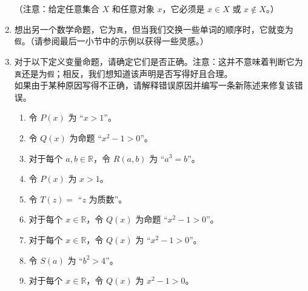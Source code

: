 \begin{enumerate}[label=(\arabic*)]
\begin{enumerate}[label=(\alph*)]
        \end{enumerate}
        （注意：给定任意集合 $X$ 和任意对象 $x$，它必须是 $x \in X$ 或 $x \notin X$。）
    \item 想出另一个数学命题，它为\verb|真|，但当我们交换一些单词的顺序时，它就变为\verb|假|。（请参阅最后一小节中的示例以获得一些灵感。）
    \item 对于以下定义变量命题，请确定它们是否正确。注意：这并不意味着判断它为\verb|真|还是为\verb|假|；相反，我们想知道该声明是否写得好且合理。\\
    如果由于某种原因写得不正确，请解释错误原因并编写一条新陈述来修复该错误。
    \begin{enumerate}[label=(\alph*)]
        \item 令 $P(x)$ 为 ``$x > 1$''。
        \item 令 $Q(x)$ 为命题 ``$x^2 - 1 > 0$''。
        \item 对于每个 $a,b \in \mathbb{R}$，令 $R(a, b)$ 为 ``$a^3 = b$''。
        \item 令 $P(x)$ 为 $x > 1$。
        \item 令 $T(z) = $ ``$z$ 为质数''。
        \item 对于每个 $x \in \mathbb{R}$，令 $Q(x)$ 为命题 ``$x^2 - 1 > 0$''。
        \item 对于每个 $x \in \mathbb{R}$，令 $Q(x)$ 为 ``$x^2 - 1 > 0$''。
        \item 令 $S(a)$ 为 ``$b^2 > 4$''。
        \item 对于每个 $x \in \mathbb{R}$，令 $Q(x)$ 为 $x^2 - 1 > 0$。
    \end{enumerate}
\end{enumerate}